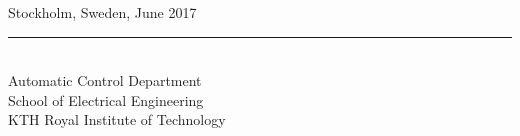 \begin{titlepage}
\begin{center}
  \large Stockholm, Sweden, June 2017 \\
  \rule{250pt}{2pt} \\
  \large Automatic Control Department \\
  \large School of Electrical Engineering \\
  \large KTH Royal Institute of Technology

\end{center}
\end{titlepage}
